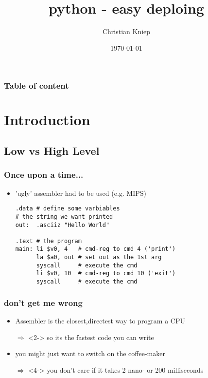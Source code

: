 \documentclass[handout]{beamer}
\author{Christian Kniep}
\begin{document}
\title[TITLE]{python - easy deploing}  
\date[\today]{\today} 

\begin{frame}
	\titlepage
\end{frame} 

\begin{frame}
	\frametitle{Table of content}
	\tableofcontents
\end{frame} 


\section{Introduction} 
	\subsection{Low vs High Level}
		\begin{frame}[fragile]
			\frametitle{Once upon a time...}
			\begin{itemize}
				\item<1-> 'ugly' assembler had to be used (e.g. MIPS)
                \begin{verbatim}
.data # define some varbiables
# the string we want printed
out:  .asciiz "Hello World"
 
.text # the program
main: li $v0, 4	  # cmd-reg to cmd 4 ('print')  
      la $a0, out # set out as the 1st arg 
      syscall     # execute the cmd
      li $v0, 10  # cmd-reg to cmd 10 ('exit')
      syscall     # execute the cmd
\end{verbatim}
            \end{itemize}
		\end{frame}
		\begin{frame}
			\frametitle{don't get me wrong}
			\begin{itemize}
				\item<1-> Assembler is the closest,directest way to program a CPU
                \item[$\Rightarrow$]<2-> so its the fastest code you can write
                \item<3-> you might just want to switch on the coffee-maker
                \item[$\Rightarrow$]<4-> you don't care if it takes 2 nano- or 200 milliseconds
            \end{itemize}
        \end{frame}
\end{document}
